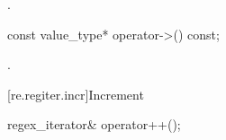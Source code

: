 \begin{itemdescr}
\pnum
\returns
{}.
\end{itemdescr}

%
\begin{itemdecl}
const value_type* operator->() const;
\end{itemdecl}

\begin{itemdescr}
\pnum
\returns
{}.
\end{itemdescr}

[re.regiter.incr]{Increment}

%
%
\begin{itemdecl}
regex_iterator& operator++();
\end{itemdecl}

